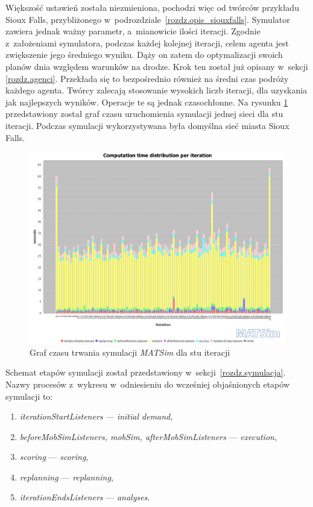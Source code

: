 \documentclass[twoside,12pt]{report}
\begin{document}
Większość ustawień została niezmieniona, pochodzi więc od twórców przykładu Sioux Falls, przybliżonego w~podrozdziale~\ref{rozdz.opis_siouxfalls}. Symulator zawiera jednak ważny parametr, a~mianowicie ilości iteracji. Zgodnie z~założeniami symulatora, podczas każdej kolejnej iteracji, celem agenta jest zwiększenie jego średniego wyniku. Dąży on zatem do optymalizacji swoich planów dnia względem warunków na drodze. Krok ten został już opisany w~sekcji \ref{rozdz.agenci}. Przekłada się to bezpośrednio również na średni czas podróży każdego agenta. Twórcy zalecają stosowanie wysokich liczb iteracji, dla uzyskania jak najlepszych wyników. Operacje te są jednak czasochłonne. Na rysunku \ref{fig:symulacja_czas} przedstawiony został graf czasu uruchomienia symulacji jednej sieci dla stu iteracji. Podczas symulacji wykorzystywana była domyślna sieć miasta Sioux Falls.

\begin{figure}[htbp]
	\centering
	\includegraphics[width=\textwidth]{img/def_stopwatch}
	\caption{Graf czasu trwania symulacji \textit{MATSim} dla stu iteracji}
	\label{fig:symulacja_czas}
\end{figure}

Schemat etapów symulacji został przedstawiony w~sekcji~\ref{rozdz.symulacja}. Nazwy procesów z~wykresu w~odniesieniu do wcześniej objaśnionych etapów symulacji to:
\begin{enumerate}
\item \textit{iterationStartListeners} --- \textit{initial demand},
\item \textit{beforeMobSimListeners, mobSim, afterMobSimListeners} --- \textit{execution}, 
\item \textit{scoring} --- \textit{scoring},
\item \textit{replanning} --- \textit{replanning},
\item \textit{iterationEndsListeners} --- \textit{analyses}.
\end{enumerate}
\end{document}
